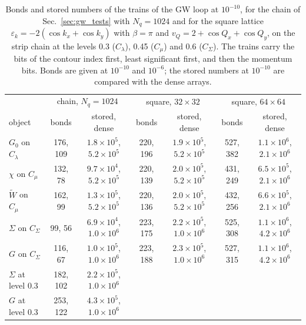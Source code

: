 \documentclass[aps,prb,reprint,a4paper]{revtex4-2}
\begin{document}
\begin{table}[t]
\caption{Bonds and stored numbers of the trains of the GW loop at $10^{-10}$, for the chain of Sec.~\ref{sec:gw_tests} with $N_q=1024$ and for the square lattice $\varepsilon_k=-2(\cos k_x+\cos k_y)$ with $\beta=\pi$ and $v_Q=2+\cos Q_x+\cos Q_y$, on the strip chain at the levels 0.3 ($C_\lambda$), 0.45 ($C_\mu$) and 0.6 ($C_\Sigma$). The trains carry the bits of the contour index first, least significant first, and then the momentum bits. Bonds are given at $10^{-10}$ and $10^{-6}$; the stored numbers at $10^{-10}$ are compared with the dense arrays.}
\label{tab:bonds}
\centering\small
\setlength{\tabcolsep}{5pt}
\begin{tabular}{@{}lcccccc@{}}
\toprule
 & \multicolumn{2}{c}{chain, $N_q=1024$} & \multicolumn{2}{c}{square, $32\times32$} & \multicolumn{2}{c}{square, $64\times64$} \\
object & bonds & stored, dense & bonds & stored, dense & bonds & stored, dense \\
\midrule
$G_0$ on $C_\lambda$ & 176, 109 & $1.8\times10^5$, $5.2\times10^5$ & 220, 196 & $1.9\times10^5$, $5.2\times10^5$ & 527, 382 & $1.1\times10^6$, $2.1\times10^6$ \\
$\chi$ on $C_\mu$ & 132, 78 & $9.7\times10^4$, $5.2\times10^5$ & 220, 139 & $2.0\times10^5$, $5.2\times10^5$ & 431, 249 & $6.5\times10^5$, $2.1\times10^6$ \\
$\tilde W$ on $C_\mu$ & 162, 99 & $1.3\times10^5$, $5.2\times10^5$ & 220, 136 & $2.0\times10^5$, $5.2\times10^5$ & 432, 256 & $6.6\times10^5$, $2.1\times10^6$ \\
$\Sigma$ on $C_\Sigma$ & 99, 56 & $6.9\times10^4$, $1.0\times10^6$ & 223, 175 & $2.2\times10^5$, $1.0\times10^6$ & 525, 308 & $1.1\times10^6$, $4.2\times10^6$ \\
$G$ on $C_\Sigma$ & 116, 67 & $1.0\times10^5$, $1.0\times10^6$ & 223, 188 & $2.3\times10^5$, $1.0\times10^6$ & 527, 315 & $1.1\times10^6$, $4.2\times10^6$ \\
$\Sigma$ at level 0.3 & 182, 102 & $2.2\times10^5$, $1.0\times10^6$ & & & & \\
$G$ at level 0.3 & 253, 122 & $4.3\times10^5$, $1.0\times10^6$ & & & & \\
\bottomrule
\end{tabular}
\end{table}
\end{document}
